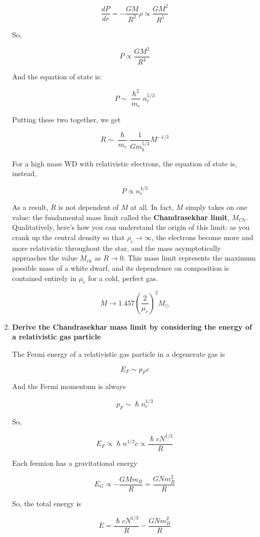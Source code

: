 \documentclass[a4paper]{article}
\begin{document}
\begin{enumerate}
$$ \frac{dP}{dr} = -\frac{GM}{R^2} \rho \propto \frac{G M^2}{R^5} $$

So,

$$ P \propto \frac{G M^2}{R^4} $$

And the equation of state is:

$$ P \sim \frac{\hslash^2}{m_e} n_e^{5/3} $$

Putting these two together, we get

$$ R \sim \frac{\hslash}{m_e} \frac{1}{G m_b^{5/3}} M^{-1/3} $$

For a high mass WD with relativistic electrons, the equation of state is, instead, 

$$ P \propto n_e^{4/3} $$

As a result, $R$ is not dependent of $M$ at all. In fact, $M$ simply takes on one value: the fundamental mass limit called the \textbf{Chandrasekhar limit}, $M_{Ch}$. Qualitatively, here's how you can understand the origin of this limit: as you crank up the central density so that $\rho_c \rightarrow \infty$, the electrons become more and more relativistic throughout the star, and the mass asymptotically approaches the value $M_{ch}$ as $R \rightarrow 0$. This mass limit represents the maximum possible mass of a white dwarf, and its dependence on composition is contained entirely in $\mu_e$ for a cold, perfect gas. 

\begin{equation}
M \rightarrow 1.457 \left( \frac{2}{\mu_e} \right)^2 M_\odot 
\end{equation}

\item \textbf{Derive the Chandrasekhar mass limit by considering the energy of a relativistic gas particle}

The Fermi energy of a relativistic gas particle in a degenerate gas is

$$ E_F \sim p_F c $$

And the Fermi momentum is always

$$ p_F \sim \hslash n_e^{1/3} $$

So, 

$$ E_F \propto \hslash n^{1/3} c \propto \frac{\hslash c N^{1/3}}{R} $$

Each fermion has a gravitational energy

$$ E_G \propto - \frac{G M m_B}{R} = \frac{G N m_B^2}{R} $$

So, the total energy is 

$$ E = \frac{\hslash c N^{1/3}}{R} - \frac{G N m_B^2}{R} $$


\end{enumerate}
\end{document}

